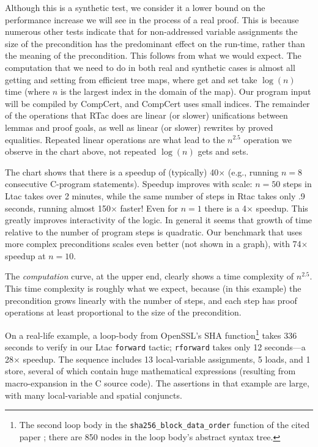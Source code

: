 \documentclass{puthesis}
\begin{document}
Although this is a synthetic test, we consider it a lower bound on the
performance increase we will see in the process of a real proof. This
is because numerous other tests indicate that for non-addressed
variable assignments the size of the precondition has the predominant
effect on the run-time, rather than the meaning of the
precondition. This follows from what we would expect. The computation
that we need to do in both real and synthetic cases is almost all
getting and setting from efficient tree maps, where get and set take
$\log(n)$ time (where $n$ is the largest index in the domain of the
map). Our program input will be
compiled by CompCert, and CompCert uses small indices. The remainder
of the operations that RTac does are linear (or slower) unifications
between lemmas and proof goals, as well as linear (or slower) rewrites
by proved equalities. Repeated linear operations are what lead to the
$n^{2.5}$ operation we observe in the chart above, not repeated
$\log(n)$ gets and sets.

The chart shows that there 
is a speedup of (typically) 40$\times$ (e.g., running $n\! = \! 8$ consecutive
C-program statements). 
Speedup improves with scale: $n\! =\! 50$ 
steps in Ltac takes over 2 minutes, while
the same number of steps in Rtac takes only .9 seconds, running almost 150$\times$ faster! 
Even for $n\!=\!1$ there is a 4$\times$ speedup.
This greatly improves interactivity of the logic. In general it
seems that growth of time relative to the number of program steps is
quadratic. Our benchmark that uses more complex preconditions
scales even better (not shown in a graph),
with 74$\times$ speedup at $n\! = \!10$.


The \emph{computation} curve, at the upper end, clearly
shows a time complexity of $n^{2.5}$.
This time complexity is roughly what we expect,
because (in this example) the
precondition grows linearly with the number of steps,
and each step has proof operations at least proportional to the size
of the precondition.

On a real-life example, a loop-body from OpenSSL's SHA
function\footnote{The second loop body in the
  \lstinline{sha256_block_data_order} function of the cited paper
  \cite{appel15:sha}; there are 850 nodes in the loop body's abstract
  syntax tree.}  takes 336 seconds to verify in our Ltac
\lstinline{forward} tactic; \lstinline|rforward| takes only 12
seconds---a 28$\times$ speedup. The sequence includes 13
local-variable assignments, 5 loads, and 1 store, several of which
contain huge mathematical expressions (resulting from macro-expansion
in the C source code). The assertions in that example are large, with
many local-variable and spatial conjuncts.
\end{document}
